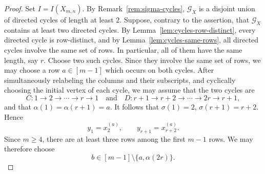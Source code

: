 \documentclass[12pt]{amsart}
\numberwithin{equation}{section}
\begin{document}
\begin{proof}
Set $I=I(X_{m,n})$. By Remark~\ref{rem:sigma-cycles},
$\mathcal G_X$ is a disjoint union of directed cycles of length
at least $2$. Suppose, contrary to the assertion, that
$\mathcal G_X$ contains at least two directed cycles.
By Lemma~\ref{lem:cycles-row-distinct}, every directed cycle
is row-distinct, and by Lemma~\ref{lem:cycles-same-rows}, all directed
cycles involve the same set of rows. In particular, all of them have
the same length, say $r$. Choose two such cycles. Since they involve
the same set of rows, we may choose a row $a\in[m-1]$ which occurs
on both cycles. After simultaneously relabeling the columns and
their subscripts, and cyclically choosing the initial vertex of
each cycle, we may assume that the two cycles are
\[
C:
1\longrightarrow2\longrightarrow\cdots\longrightarrow r
\longrightarrow1
\quad \text{and}\quad
D:
r+1\longrightarrow r+2\longrightarrow\cdots
\longrightarrow2r\longrightarrow r+1,
\]
and that $\alpha(1)=\alpha(r+1)=a$.
It follows that $\sigma(1)=2$, $\sigma(r+1)=r+2$. Hence
\begin{equation}\label{eq:8}
y_1=x_2^{(a)},
\qquad
y_{r+1}=x_{r+2}^{(a)}.
\end{equation}
Since $m\geq4$, there are at least three rows among the first $m-1$
rows. We may therefore choose
\begin{equation}\label{eq:9}
b\in[m-1]\setminus\{a,\alpha(2r)\}.
\end{equation}


\end{proof}
\end{document}
